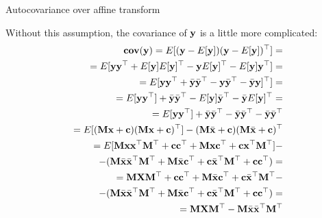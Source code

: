 \documentclass{beamer}
\begin{document}
\begin{frame}{Autocovariance over affine transform}
	\begin{flushleft}
		
		Without this assumption, the covariance of $\mathbf{y}$ is a little more complicated:
		\begin{align*}
			\textbf{cov}(\mathbf{y}) = E[(\mathbf{y} - E[\mathbf{y}])(\mathbf{y} - E[\mathbf{y}])^\top] =
			\\
			= E[\mathbf{y}\mathbf{y}^\top
			+ E[\mathbf{y}]E[\mathbf{y}]^\top
			- \mathbf{y}E[\mathbf{y}]^\top
			- E[\mathbf{y}]\mathbf{y}^\top] =
			\\
			=
			E[\mathbf{y}\mathbf{y}^\top
			+ \bar{\mathbf{y}}\bar{\mathbf{y}}^\top
			- \mathbf{y}\bar{\mathbf{y}}^\top
			- \bar{\mathbf{y}}\mathbf{y}]^\top]=
			\\
			=
			E[\mathbf{y}\mathbf{y}^\top]
			+ \bar{\mathbf{y}}\bar{\mathbf{y}}^\top
			- E[\mathbf{y}]\bar{\mathbf{y}}^\top
			- \bar{\mathbf{y}}E[\mathbf{y}]^\top=
			\\
			=
			E[\mathbf{y}\mathbf{y}^\top]
			+ \bar{\mathbf{y}}\bar{\mathbf{y}}^\top
			- \bar{\mathbf{y}}\bar{\mathbf{y}}^\top
			- \bar{\mathbf{y}}\bar{\mathbf{y}}^\top
			\\
			=
			E[(\mathbf{M}\mathbf{x} + \mathbf{c})(\mathbf{M}\mathbf{x} + \mathbf{c})^\top]
			- (\mathbf{M}\bar{\mathbf{x}} + \mathbf{c})(\mathbf{M}\bar{\mathbf{x}} + \mathbf{c})^\top
			\\
			=
			E[\mathbf{M}\mathbf{x}\mathbf{x}^\top \mathbf{M}^\top+
			\mathbf{c}\mathbf{c}^\top+
			\mathbf{M}\mathbf{x}\mathbf{c}^\top+
			\mathbf{c}\mathbf{x}^\top \mathbf{M}^\top]
			-\\
			- (\mathbf{M}\bar{\mathbf{x}}\bar{\mathbf{x}}^\top\mathbf{M}^\top +
			\mathbf{M}\bar{\mathbf{x}}\mathbf{c}^\top+
			\mathbf{c}\bar{\mathbf{x}}^\top\mathbf{M}^\top+
			\mathbf{c}\mathbf{c}^\top)=
			\\
			=
			\mathbf{M}\mathbf{X} \mathbf{M}^\top+
			\mathbf{c}\mathbf{c}^\top+
			\mathbf{M}\bar{\mathbf{x}}\mathbf{c}^\top+
			\mathbf{c}\bar{\mathbf{x}}^\top \mathbf{M}^\top
			-\\
			- (\mathbf{M}\bar{\mathbf{x}}\bar{\mathbf{x}}^\top\mathbf{M}^\top +
			\mathbf{M}\bar{\mathbf{x}}\mathbf{c}^\top+
			\mathbf{c}\bar{\mathbf{x}}^\top\mathbf{M}^\top+
			\mathbf{c}\mathbf{c}^\top)=
			\\
			=
			\mathbf{M}\mathbf{X} \mathbf{M}^\top
			- \mathbf{M}\bar{\mathbf{x}}\bar{\mathbf{x}}^\top\mathbf{M}^\top
		\end{align*}
		
	\end{flushleft}
\end{frame}
\end{document}
